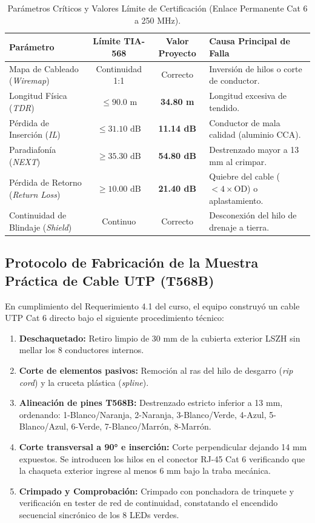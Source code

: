 \documentclass[11pt,a4paper]{article}
\begin{document}
\begin{table}[h!]
\centering
\small
\caption{Parámetros Críticos y Valores Límite de Certificación (Enlace Permanente Cat 6 a 250 MHz).}
\label{tab:pruebas}
\begin{tabularx}{\textwidth}{l c c X}
\toprule
\textbf{Parámetro} & \textbf{Límite TIA-568} & \textbf{Valor Proyecto} & \textbf{Causa Principal de Falla} \\
\midrule
Mapa de Cableado (\textit{Wiremap}) & Continuidad 1:1 & Correcto & Inversión de hilos o corte de conductor. \\
Longitud Física (\textit{TDR}) & $\le 90.0\text{ m}$ & \textbf{34.80 m} & Longitud excesiva de tendido. \\
Pérdida de Inserción (\textit{IL}) & $\le 31.10\text{ dB}$ & \textbf{11.14 dB} & Conductor de mala calidad (aluminio CCA). \\
Paradiafonía (\textit{NEXT}) & $\ge 35.30\text{ dB}$ & \textbf{54.80 dB} & Destrenzado mayor a 13 mm al crimpar. \\
Pérdida de Retorno (\textit{Return Loss}) & $\ge 10.00\text{ dB}$ & \textbf{21.40 dB} & Quiebre del cable ($< 4\times\text{OD}$) o aplastamiento. \\
Continuidad de Blindaje (\textit{Shield}) & Continuo & Correcto & Desconexión del hilo de drenaje a tierra. \\
\bottomrule
\end{tabularx}
\end{table}

\subsection{Protocolo de Fabricación de la Muestra Práctica de Cable UTP (T568B)}
En cumplimiento del Requerimiento 4.1 del curso, el equipo construyó un cable UTP Cat 6 directo bajo el siguiente procedimiento técnico:
\begin{enumerate}[noitemsep]
    \item \textbf{Deschaquetado:} Retiro limpio de 30 mm de la cubierta exterior LSZH sin mellar los 8 conductores internos.
    \item \textbf{Corte de elementos pasivos:} Remoción al ras del hilo de desgarro (\textit{rip cord}) y la cruceta plástica (\textit{spline}).
    \item \textbf{Alineación de pines T568B:} Destrenzado estricto inferior a 13 mm, ordenando: 1-Blanco/Naranja, 2-Naranja, 3-Blanco/Verde, 4-Azul, 5-Blanco/Azul, 6-Verde, 7-Blanco/Marrón, 8-Marrón.
    \item \textbf{Corte transversal a 90° e inserción:} Corte perpendicular dejando 14 mm expuestos. Se introducen los hilos en el conector RJ-45 Cat 6 verificando que la chaqueta exterior ingrese al menos 6 mm bajo la traba mecánica.
    \item \textbf{Crimpado y Comprobación:} Crimpado con ponchadora de trinquete y verificación en tester de red de continuidad, constatando el encendido secuencial sincrónico de los 8 LEDs verdes.
\end{enumerate}
\end{document}
